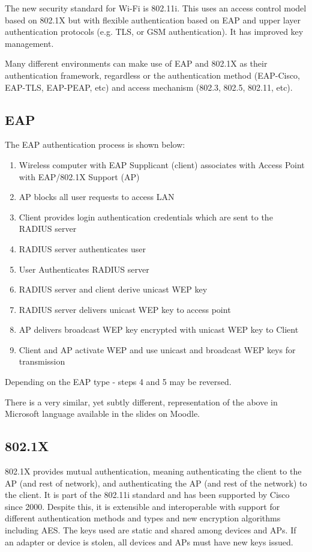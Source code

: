 The new security standard for Wi-Fi is 802.11i. This uses an access control model based on 802.1X but with flexible authentication based on EAP and upper layer authentication protocols (e.g. TLS, or GSM authentication). It has improved key management.

Many different environments can make use of EAP and 802.1X as their authentication framework, regardless or the authentication method (EAP-Cisco, EAP-TLS, EAP-PEAP, etc) and access mechanism (802.3, 802.5, 802.11, etc). 

\subsection{EAP}
The EAP authentication process is shown below:
\begin{enumerate}
    \item Wireless computer with EAP Supplicant (client) associates with Access Point with EAP/802.1X Support (AP)
    \item AP blocks all user requests to access LAN
    \item Client provides login authentication credentials which are sent to the RADIUS server
    \item RADIUS server authenticates user
    \item User Authenticates RADIUS server
    \item RADIUS server and client derive unicast WEP key
    \item RADIUS server delivers unicast WEP key to access point
    \item AP delivers broadcast WEP key encrypted with unicast WEP key to Client
    \item Client and AP activate WEP and use unicast and broadcast WEP keys for transmission
\end{enumerate}
Depending on the EAP type - steps 4 and 5 may be reversed. 

\begin{extlink}
There is a very similar, yet subtly different, representation of the above in Microsoft language available in the slides on Moodle.
\end{extlink}

\subsection{802.1X}
802.1X provides mutual authentication, meaning authenticating the client to the AP (and rest of network), and authenticating the AP (and rest of the network) to the client. It is part of the 802.11i standard and has been supported by Cisco since 2000. Despite this, it is extensible and interoperable with support for different authentication methods and types and new encryption algorithms including AES. The keys used are static and shared among devices and APs. If an adapter or device is stolen, all devices and APs must have new keys issued. 

